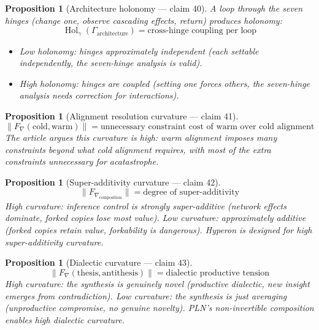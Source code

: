 \documentclass[11pt,a4paper]{article}
\newtheorem{proposition}[definition]{Proposition}
\begin{document}
\begin{proposition}[Architecture holonomy --- claim 40]
\label{prop:arch_hol}
A loop through the seven hinges (change one, observe cascading effects,
return) produces holonomy:
\[
  \operatorname{Hol}_\gamma(\Gamma_{\text{architecture}}) =
    \text{cross-hinge coupling per loop}
\]
\begin{itemize}
  \item Low holonomy: hinges approximately independent (each settable
    independently, the seven-hinge analysis is valid).
  \item High holonomy: hinges are coupled (setting one forces others,
    the seven-hinge analysis needs correction for interactions).
\end{itemize}
\end{proposition}

\begin{proposition}[Alignment resolution curvature --- claim 41]
\label{prop:align_curv}
\[
  \|F_\nabla(\text{cold}, \text{warm})\| = \text{unnecessary constraint
    cost of warm over cold alignment}
\]
The article argues this curvature is high: warm alignment imposes many
constraints beyond what cold alignment requires, with most of the extra
constraints unnecessary for acatastrophe.
\end{proposition}

\begin{proposition}[Super-additivity curvature --- claim 42]
\label{prop:superadd_curv}
\[
  \|F_{\nabla_{\text{composition}}}\| = \text{degree of super-additivity}
\]
High curvature: inference control is strongly super-additive (network
effects dominate, forked copies lose most value). Low curvature:
approximately additive (forked copies retain value, forkability is
dangerous). Hyperon is designed for high super-additivity curvature.
\end{proposition}

\begin{proposition}[Dialectic curvature --- claim 43]
\label{prop:dialectic_curv}
\[
  \|F_\nabla(\text{thesis}, \text{antithesis})\| = \text{dialectic
    productive tension}
\]
High curvature: the synthesis is genuinely novel (productive dialectic,
new insight emerges from contradiction). Low curvature: the synthesis
is just averaging (unproductive compromise, no genuine novelty).
PLN's non-invertible composition enables high dialectic curvature.
\end{proposition}
\end{document}
